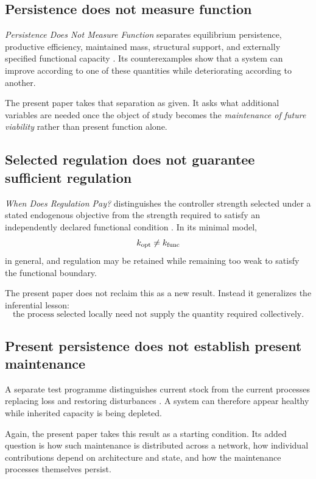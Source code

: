 \subsection{Persistence does not measure function}

\emph{Persistence Does Not Measure Function} separates equilibrium persistence, productive efficiency, maintained mass, structural support, and externally specified functional capacity \citep{vanhoek2026persistence}. Its counterexamples show that a system can improve according to one of these quantities while deteriorating according to another.

The present paper takes that separation as given. It asks what additional variables are needed once the object of study becomes the \emph{maintenance of future viability} rather than present function alone.

\subsection{Selected regulation does not guarantee sufficient regulation}

\emph{When Does Regulation Pay?} distinguishes the controller strength selected under a stated endogenous objective from the strength required to satisfy an independently declared functional condition \citep{vanhoek2026regulation}. In its minimal model,
\[
k_{\rm opt}\neq k_{\rm func}
\]
in general, and regulation may be retained while remaining too weak to satisfy the functional boundary.

The present paper does not reclaim this as a new result. Instead it generalizes the inferential lesson:
\[
\boxed{
\text{the process selected locally need not supply the quantity required collectively.}
}
\]

\subsection{Present persistence does not establish present maintenance}

A separate test programme distinguishes current stock from the current processes replacing loss and restoring disturbances \citep{vanhoek2026present}. A system can therefore appear healthy while inherited capacity is being depleted.

Again, the present paper takes this result as a starting condition. Its added question is how such maintenance is distributed across a network, how individual contributions depend on architecture and state, and how the maintenance processes themselves persist.


